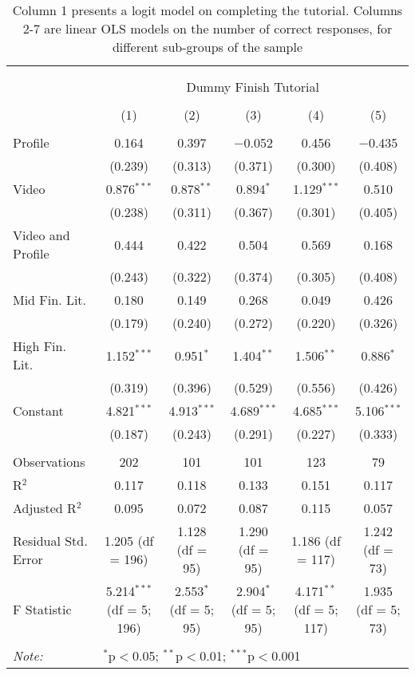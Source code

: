 
\begin{table}[H] \centering 
  \caption{Column 1 presents a logit model on completing the tutorial. Columns 2-7 are linear OLS models on the number
            of correct responses, for different sub-groups of the sample} 
  \label{tbl:Main_results_correct_response} 
\begin{tabular}{@{\extracolsep{5pt}}lccccc} 
\\[-1.8ex]\hline 
\hline \\[-1.8ex] 
\\[-1.8ex] & \multicolumn{5}{c}{Dummy Finish Tutorial} \\ 
\\[-1.8ex] & (1) & (2) & (3) & (4) & (5)\\ 
\hline \\[-1.8ex] 
 Profile & 0.164 & 0.397 & $-$0.052 & 0.456 & $-$0.435 \\ 
  & (0.239) & (0.313) & (0.371) & (0.300) & (0.408) \\ 
  Video & 0.876$^{***}$ & 0.878$^{**}$ & 0.894$^{*}$ & 1.129$^{***}$ & 0.510 \\ 
  & (0.238) & (0.311) & (0.367) & (0.301) & (0.405) \\ 
  Video and Profile & 0.444 & 0.422 & 0.504 & 0.569 & 0.168 \\ 
  & (0.243) & (0.322) & (0.374) & (0.305) & (0.408) \\ 
  Mid Fin. Lit. & 0.180 & 0.149 & 0.268 & 0.049 & 0.426 \\ 
  & (0.179) & (0.240) & (0.272) & (0.220) & (0.326) \\ 
  High Fin. Lit. & 1.152$^{***}$ & 0.951$^{*}$ & 1.404$^{**}$ & 1.506$^{**}$ & 0.886$^{*}$ \\ 
  & (0.319) & (0.396) & (0.529) & (0.556) & (0.426) \\ 
  Constant & 4.821$^{***}$ & 4.913$^{***}$ & 4.689$^{***}$ & 4.685$^{***}$ & 5.106$^{***}$ \\ 
  & (0.187) & (0.243) & (0.291) & (0.227) & (0.333) \\ 
 \hline \\[-1.8ex] 
Observations & 202 & 101 & 101 & 123 & 79 \\ 
R$^{2}$ & 0.117 & 0.118 & 0.133 & 0.151 & 0.117 \\ 
Adjusted R$^{2}$ & 0.095 & 0.072 & 0.087 & 0.115 & 0.057 \\ 
Residual Std. Error & 1.205 (df = 196) & 1.128 (df = 95) & 1.290 (df = 95) & 1.186 (df = 117) & 1.242 (df = 73) \\ 
F Statistic & 5.214$^{***}$ (df = 5; 196) & 2.553$^{*}$ (df = 5; 95) & 2.904$^{*}$ (df = 5; 95) & 4.171$^{**}$ (df = 5; 117) & 1.935 (df = 5; 73) \\ 
\hline 
\hline \\[-1.8ex] 
\textit{Note:}  & \multicolumn{5}{l}{$^{*}$p$<$0.05; $^{**}$p$<$0.01; $^{***}$p$<$0.001} \\ 
\end{tabular} 
\end{table} 
